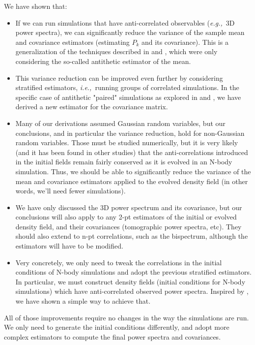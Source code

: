 \documentclass{aastex6}
\newcommand{\ie}{{\textit{i.e.,}~}}
\newcommand{\eg}{{\textit{e.g.,}~}}
\begin{document}
We have shown that:
\begin{itemize}
	\item If we can run simulations that have anti-correlated observables (\eg 3D power spectra), we can significantly reduce the variance of the sample mean and covariance estimators (estimating $P_k$ and its covariance). This is a generalization of the techniques described in \cite{PontzenEtAl2016} and \cite{AnguloPontzen2016}, which were only considering the so-called antithetic estimator of the mean.
	\item This variance reduction can be improved even further by considering stratified estimators, \ie running groups of correlated simulations. In the specific case of antithetic "paired" simulations as explored in \cite{PontzenEtAl2016} and \cite{AnguloPontzen2016}, we have derived a new estimator for the covariance matrix.
	\item Many of our derivations assumed Gaussian random variables, but our conclusions, and in particular the variance reduction, hold for non-Gaussian random variables. Those must be studied numerically, but it is very likely (and it has been found in other studies) that the anti-correlations introduced in the initial fields remain fairly conserved as it is evolved in an N-body simulation.
	Thus, we should be able to significantly reduce the variance of the mean and covariance estimators applied to the evolved density field (in other words, we'll need fewer simulations).
	\item We have only discussed the 3D power spectrum and its covariance, but our conclusions will also apply to any 2-pt estimators of the initial or evolved density field, and their covariances (tomographic power spectra, etc). They should also extend to n-pt correlations, such as the bispectrum, although the estimators will have to be modified.
	\item Very concretely, we only need to tweak the correlations in the initial conditions of N-body simulations and adopt the previous stratified estimators. In particular, we must construct density fields (initial conditions for N-body simulations) which have anti-correlated observed power spectra. Inspired by \cite{AnguloPontzen2016}, we have shown a simple way to achieve that. 
\end{itemize}

All of those improvements require no changes in the way the simulations are run. We only need to generate the initial conditions differently, and adopt more complex estimators to compute the final power spectra and covariances.
\end{document}
